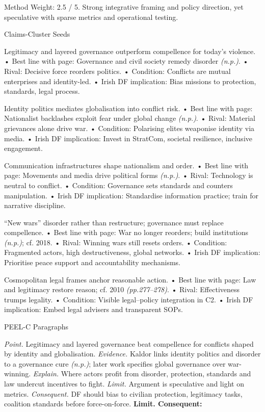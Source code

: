 Method Weight: 2.5 / 5. Strong integrative framing and policy direction, yet speculative with sparse metrics and operational testing.

Claims-Cluster Seeds

Legitimacy and layered governance outperform compellence for today’s violence.
• Best line with page: Governance and civil society remedy disorder \emph{(n.p.)}.
• Rival: Decisive force reorders politics.
• Condition: Conflicts are mutual enterprises and identity-led.
• Irish DF implication: Bias missions to protection, standards, legal process.

Identity politics mediates globalisation into conflict risk.
• Best line with page: Nationalist backlashes exploit fear under global change \emph{(n.p.)}.
• Rival: Material grievances alone drive war.
• Condition: Polarising elites weaponise identity via media.
• Irish DF implication: Invest in StratCom, societal resilience, inclusive engagement.

Communication infrastructures shape nationalism and order.
• Best line with page: Movements and media drive political forms \emph{(n.p.)}.
• Rival: Technology is neutral to conflict.
• Condition: Governance sets standards and counters manipulation.
• Irish DF implication: Standardise information practice; train for narrative discipline.

“New wars” disorder rather than restructure; governance must replace compellence.
• Best line with page: War no longer reorders; build institutions \emph{(n.p.)}; cf. 2018.
• Rival: Winning wars still resets orders.
• Condition: Fragmented actors, high destructiveness, global networks.
• Irish DF implication: Prioritise peace support and accountability mechanisms.

Cosmopolitan legal frames anchor reasonable action.
• Best line with page: Law and legitimacy restore reason; cf. 2010 \emph{(pp.277–278)}.
• Rival: Effectiveness trumps legality.
• Condition: Visible legal–policy integration in C2.
• Irish DF implication: Embed legal advisers and transparent SOPs.

PEEL-C Paragraphs

\textit{Point.} Legitimacy and layered governance beat compellence for conflicts shaped by identity and globalisation.
\textit{Evidence.} Kaldor links identity politics and disorder to a governance cure \emph{(n.p.)}; later work specifies global governance over war-winning.
\textit{Explain.} Where actors profit from disorder, protection, standards and law undercut incentives to fight.
\textit{Limit.} Argument is speculative and light on metrics.
\textit{Consequent.} DF should bias to civilian protection, legitimacy tasks, coalition standards before force-on-force. \textbf{Limit. Consequent:}

